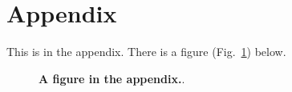 \documentclass{article}
\begin{document}
\lipsum[1]




\renewcommand{\theequation}{A\arabic{equation}}
\renewcommand{\thefigure}{A\arabic{figure}}
\renewcommand{\thetable}{A\arabic{table}}
\setcounter{figure}{0}
\setcounter{equation}{0}
\setcounter{table}{0}

\appendix
\renewcommand{\thesection}{A\arabic{section}}

\section{Appendix} \label{appendix}

This is in the appendix. There is a figure (Fig.~\ref{fig:A1}) below.

\lipsum[1-3]

\begin{figure}[ht]
\begin{center}
\caption{\textbf{A figure in the appendix.}.
}
\label{fig:A1}
\end{center}
\end{figure}
\end{document}
